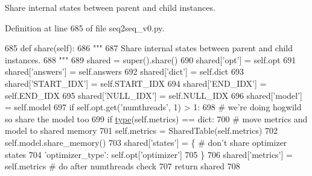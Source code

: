 \begin{DoxyVerb}Share internal states between parent and child instances.
\end{DoxyVerb}
 

Definition at line 685 of file seq2seq\+\_\+v0.\+py.


\begin{DoxyCode}
685     \textcolor{keyword}{def }share(self):
686         \textcolor{stringliteral}{"""}
687 \textcolor{stringliteral}{        Share internal states between parent and child instances.}
688 \textcolor{stringliteral}{        """}
689         shared = super().share()
690         shared[\textcolor{stringliteral}{'opt'}] = self.opt
691         shared[\textcolor{stringliteral}{'answers'}] = self.answers
692         shared[\textcolor{stringliteral}{'dict'}] = self.dict
693         shared[\textcolor{stringliteral}{'START\_IDX'}] = self.START\_IDX
694         shared[\textcolor{stringliteral}{'END\_IDX'}] = self.END\_IDX
695         shared[\textcolor{stringliteral}{'NULL\_IDX'}] = self.NULL\_IDX
696         shared[\textcolor{stringliteral}{'model'}] = self.model
697         \textcolor{keywordflow}{if} self.opt.get(\textcolor{stringliteral}{'numthreads'}, 1) > 1:
698             \textcolor{comment}{# we're doing hogwild so share the model too}
699             \textcolor{keywordflow}{if} \hyperlink{namespaceparlai_1_1agents_1_1tfidf__retriever_1_1build__tfidf_ad5dfae268e23f506da084a9efb72f619}{type}(self.metrics) == dict:
700                 \textcolor{comment}{# move metrics and model to shared memory}
701                 self.metrics = SharedTable(self.metrics)
702                 self.model.share\_memory()
703             shared[\textcolor{stringliteral}{'states'}] = \{  \textcolor{comment}{# don't share optimizer states}
704                 \textcolor{stringliteral}{'optimizer\_type'}: self.opt[\textcolor{stringliteral}{'optimizer'}]
705             \}
706         shared[\textcolor{stringliteral}{'metrics'}] = self.metrics  \textcolor{comment}{# do after numthreads check}
707         \textcolor{keywordflow}{return} shared
708 
\end{DoxyCode}
\mbox{\label{classparlai_1_1agents_1_1legacy__agents_1_1seq2seq_1_1seq2seq__v0_1_1Seq2seqAgent_a86c41e705170f0b2e56a5bbc378aead9}} 

